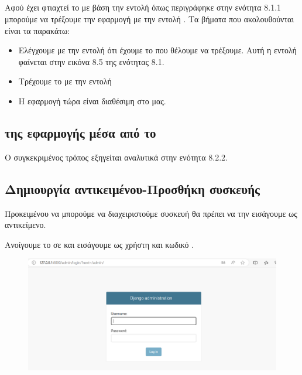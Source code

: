 \subsection{}

Αφού έχει φτιαχτεί το  με βάση την εντολή  όπως περιγράφηκε στην ενότητα 8.1.1 μπορούμε να τρέξουμε την εφαρμογή με την εντολή . Τα βήματα που ακολουθούνται είναι τα παρακάτω:


\begin{itemize}
    \item Ελέγχουμε με την εντολή  ότι έχουμε το  που θέλουμε να τρέξουμε. Αυτή η εντολή φαίνεται στην εικόνα 8.5 της ενότητας 8.1.
    \item Τρέχουμε το  με την εντολή 
    \item Η εφαρμογή τώρα είναι διαθέσιμη στο  μας.

\end{itemize}

\subsection{ της εφαρμογής μέσα από το }

Ο συγκεκριμένος τρόπος εξηγείται αναλυτικά στην ενότητα 8.2.2.

\subsection{Δημιουργία αντικειμένου-Προσθήκη συσκευής}

Προκειμένου να μπορούμε να διαχειριστούμε συσκευή θα πρέπει να την εισάγουμε ως αντικείμενο.

Ανοίγουμε το  σε  και εισάγουμε ως χρήστη 
και κωδικό .

\FloatBarrier

\begin{figure}[h]
	\centering
	\includegraphics[width=1.1\textwidth]{graphics/GUI_LOGIN.png}
	\caption{}
\end{figure}

